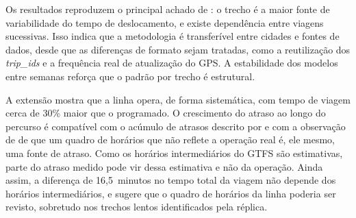 Os resultados reproduzem o principal achado de \cite{courb}: o trecho
é a maior fonte de variabilidade do tempo de deslocamento, e existe dependência entre viagens
sucessivas. Isso indica que a metodologia é transferível entre cidades e fontes de dados, desde
que as diferenças de formato sejam tratadas, como a reutilização dos \textit{trip\_ids} e a
frequência real de atualização do GPS. A estabilidade dos modelos entre semanas reforça que o
padrão por trecho é estrutural.

A extensão mostra que a linha opera, de forma sistemática, com tempo de viagem cerca de 30\%
maior que o programado. O crescimento do atraso ao longo do percurso é compatível com o
acúmulo de atrasos descrito por \cite{Zhang2024} e com a observação
de \cite{doi:10.1177/0361198106195500103} de
que um quadro de horários que não reflete a operação real é, ele mesmo, uma fonte de atraso.
Como os horários intermediários do GTFS são estimativas, parte do atraso medido pode vir dessa
estimativa e não da operação. Ainda assim, a diferença de 16,5~minutos no tempo total da viagem
não depende dos horários intermediários, e sugere que o quadro de horários da linha poderia ser
revisto, sobretudo nos trechos lentos identificados pela réplica.
